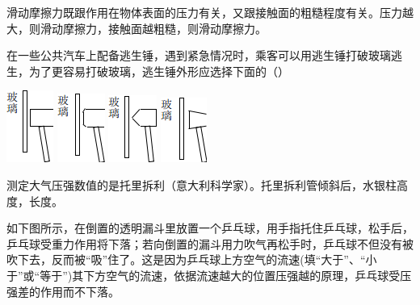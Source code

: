 \documentclass[12pt,twoside]{exam}
\begin{document}
\begin{knowledge}
\begin{questions}
滑动摩擦力既跟作用在物体表面的压力有关，又跟接触面的粗糙程度有关。压力越大，则滑动摩擦力\answerline*[越大]，接触面越粗糙，则滑动摩擦力\answerline*[越大]。


\question
在一些公共汽车上配备逃生锤，遇到紧急情况时，乘客可以用逃生锤打破玻璃逃生，为了更容易打破玻璃，逃生锤外形应选择下面的（\answerline*[C]）
\begin{choices}
\begin{multicols}{4}
\choice \includegraphics[scale=1]{figures/图片1-1.png} 
\columnbreak
\choice \includegraphics[scale=1]{figures/图片1-2.png} 
\columnbreak
\choice \includegraphics[scale=1]{figures/图片1-3.png} 
\columnbreak
\choice \includegraphics[scale=1]{figures/图片1-4.png} 
\end{multicols}
\end{choices}


\question
测定大气压强数值的是托里拆利（意大利科学家）。托里拆利管倾斜后，水银柱高度\answerline*[不变]，长度\answerline*[变长]。


\question
如下图所示，在倒置的透明漏斗里放置一个乒乓球，用手指托住乒乓球，松手后，乒乓球受重力作用将下落；若向倒置的漏斗用力吹气再松手时，乒乓球不但没有被吹下去，反而被“吸”住了。这是因为乒乓球上方空气的流速\answerline*[大于] (填“大于”、“小于”或“等于”)其下方空气的流速，依据流速越大的位置压强越\answerline*[小]的原理，乒乓球受压强差的作用而不下落。


\end{questions}
\end{knowledge}
\end{document}
